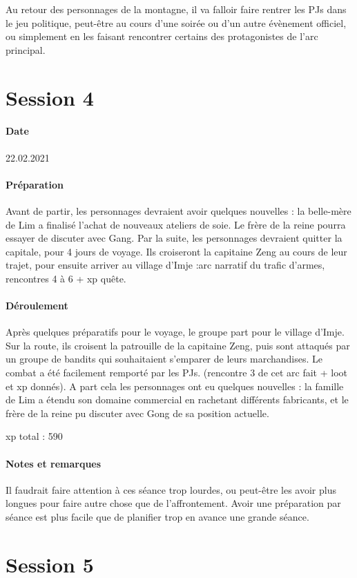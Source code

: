 \documentclass[10pt,a4paper]{book}
\begin{document}
Au retour des personnages de la montagne, il va falloir faire rentrer les PJs dans le jeu politique, peut-être au cours d'une soirée ou d'un autre évènement officiel, ou simplement en les faisant rencontrer certains des protagonistes de l'arc principal.
\section{Session 4}
\paragraph{Date}22.02.2021
\paragraph{Préparation} Avant de partir, les personnages devraient avoir quelques nouvelles : la belle-mère de Lim a finalisé l'achat de nouveaux ateliers de soie. Le frère de la reine pourra essayer de discuter avec Gang. Par la suite, les personnages devraient quitter la capitale, pour 4 jours de voyage. Ils croiseront la capitaine Zeng au cours de leur trajet, pour ensuite arriver au village d'Imje :arc narratif du trafic d'armes, rencontres 4 à 6 + xp quête.
\paragraph{Déroulement}
Après quelques préparatifs pour le voyage, le groupe part pour le village d'Imje. Sur la route, ils croisent la patrouille de la capitaine Zeng, puis sont attaqués par un groupe de bandits qui souhaitaient s'emparer de leurs marchandises. Le combat a été facilement remporté par les PJs. (rencontre 3 de cet arc fait + loot et xp donnés). A part cela les personnages ont eu quelques nouvelles : la famille de Lim a étendu son domaine commercial en rachetant différents fabricants, et le frère de la reine pu discuter avec Gong de sa position actuelle.

xp total : 590
\paragraph{Notes et remarques}
Il faudrait faire attention à ces séance trop lourdes, ou peut-être les avoir plus longues pour faire autre chose que de l'affrontement. Avoir une préparation par séance est plus facile que de planifier trop en avance une grande séance.
\section{Session 5}
\end{document}
